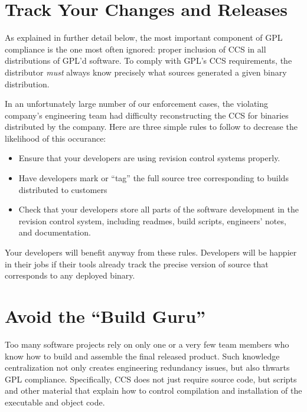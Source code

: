 \section{Track Your Changes and Releases}

As explained in further detail below, the most important component of GPL
compliance is the one most often ignored: proper inclusion of CCS in all
distributions  of GPL'd
software.  To comply with GPL's CCS requirements, the distributor
\textit{must} always know precisely what sources generated a given binary
distribution.

In an unfortunately large number of our enforcement cases, the violating
company's engineering team had difficulty reconstructing the CCS
for binaries distributed by the company.  Here are three simple rules to
follow to decrease the likelihood of this occurance:

\begin{itemize}

\item Ensure that your
developers are using revision control systems properly.

\item Have developers mark or ``tag'' the full source tree corresponding to
  builds distributed to customers

\item Check that your developers store all parts of the software
development in the revision control system, including {\sc readme}s, build
scripts, engineers' notes, and documentation.
\end{itemize}

Your developers will benefit anyway from these rules.  Developers will be
happier in their jobs if their tools already track the precise version of
source that corresponds to any deployed binary.

\section{Avoid the ``Build Guru''}

Too many software projects rely on only one or a very few team members who
know how to build and assemble the final released product.  Such knowledge
centralization not only creates engineering redundancy issues, but also
thwarts GPL compliance.  Specifically, CCS does not just require source code,
but scripts and other material that explain how to control compilation and
installation of the executable and object code.

